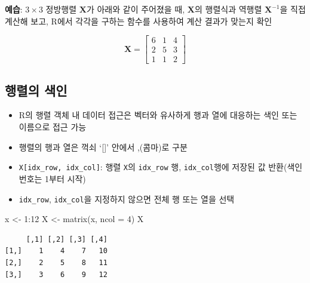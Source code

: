 \documentclass[
  11pt,
]{krantz}
\makeatletter
\newenvironment{Shaded}{\begin{snugshade}}{\end{snugshade}}
\newcommand{\AttributeTok}[1]{\textcolor[rgb]{0.61,0.61,0.61}{#1}}
\newcommand{\DecValTok}[1]{\textcolor[rgb]{0.06,0.06,0.06}{#1}}
\newcommand{\FunctionTok}[1]{\textcolor[rgb]{0,0,0}{#1}}
\newcommand{\NormalTok}[1]{#1}
\newcommand{\OtherTok}[1]{\textcolor[rgb]{0.37,0.37,0.37}{#1}}
\newcommand{\SpecialCharTok}[1]{\textcolor[rgb]{0,0,0}{#1}}
\providecommand{\tightlist}{%
  \setlength{\itemsep}{0pt}\setlength{\parskip}{0pt}}
\newenvironment{kframe}{%
\medskip{}
\setlength{\fboxsep}{.8em}
 \def\at@end@of@kframe{}%
 \ifinner\ifhmode%
  \def\at@end@of@kframe{\end{minipage}}%
  \begin{minipage}{\columnwidth}%
 \fi\fi%
 \def\FrameCommand##1{\hskip\@totalleftmargin \hskip-\fboxsep
 \colorbox{shadecolor}{##1}\hskip-\fboxsep
     \hskip-\linewidth \hskip-\@totalleftmargin \hskip\columnwidth}%
 \MakeFramed {\advance\hsize-\width
   \@totalleftmargin\z@ \linewidth\hsize
   \@setminipage}}%
 {\par\unskip\endMakeFramed%
 \at@end@of@kframe}
\newenvironment{rmdblock}[1]
  {
  \begin{itemize}
  \renewcommand{\labelitemi}{
    \raisebox{-.7\height}[0pt][0pt]{
      {\setkeys{Gin}{width=3em,keepaspectratio}\texttt{[image: images/\#1]}}
    }
  }
  \setlength{\fboxsep}{1em}
  \begin{kframe}
  \item
  }
  {
  \end{kframe}
  \end{itemize}
  }
\newenvironment{rmdimportant}
  {\begin{rmdblock}{important}}
  {\end{rmdblock}}
\makeatother
\begin{document}
\normalsize

\footnotesize

\begin{rmdimportant}
\textbf{예습}: \(3\times 3\) 정방행렬 \(\mathrm{\mathbf{X}}\)가 아래와 같이 주어졌을 때, \(\mathrm{\mathbf{X}}\)의 행렬식과 역행렬 \(\mathrm{\mathbf{X}}^{-1}\)을 직접 계산해 보고, R에서 각각을 구하는 함수를 사용하여 계산 결과가 맞는지 확인

\[\mathrm{\mathbf{X}} = 
\begin{bmatrix}
6 & 1 & 4 \\
2 & 5 & 3 \\
1 & 1 & 2
\end{bmatrix}
\]
\end{rmdimportant}

\normalsize

\hypertarget{mat-index}{%
\subsection{행렬의 색인}\label{mat-index}}

\begin{itemize}
\tightlist
\item
  R의 행렬 객체 내 데이터 접근은 벡터와 유사하게 행과 열에 대응하는 색인 또는 이름으로 접근 가능
\item
  행렬의 행과 열은 꺽쇠 `{[}{]}' 안에서 ,(콤마)로 구분
\item
  \texttt{X{[}idx\_row,\ idx\_col{]}}: 행렬 \texttt{X}의 \texttt{idx\_row} 행, \texttt{idx\_col}행에 저장된 값 반환(색인번호는 1부터 시작)
\item
  \texttt{idx\_row}, \texttt{idx\_col}을 지정하지 않으면 전체 행 또는 열을 선택
\end{itemize}

\footnotesize

\begin{Shaded}
\begin{Highlighting}[]
\NormalTok{x }\OtherTok{\textless{}{-}} \DecValTok{1}\SpecialCharTok{:}\DecValTok{12}
\NormalTok{X }\OtherTok{\textless{}{-}} \FunctionTok{matrix}\NormalTok{(x, }\AttributeTok{ncol =} \DecValTok{4}\NormalTok{)}
\NormalTok{X}
\end{Highlighting}
\end{Shaded}

\begin{verbatim}
     [,1] [,2] [,3] [,4]
[1,]    1    4    7   10
[2,]    2    5    8   11
[3,]    3    6    9   12
\end{verbatim}
\end{document}

